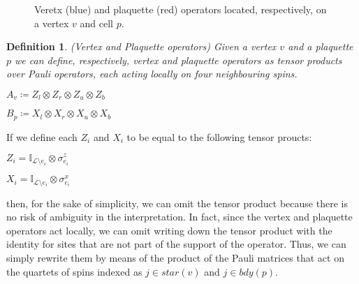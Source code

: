 \documentclass{Configuration_Files/PoliMi3i_thesis}
\newtheorem{definition}{Definition}[chapter]
\begin{document}
\begin{figure}
\begin{center}
	\end{center}
	\caption{Veretx (blue) and plaquette (red) operators located, respectively, on a vertex $v$ and cell $p$.}
	\label{fig:operators}
\end{figure}



\begin{definition} (Vertex and Plaquette operators) Given a vertex $v$ and a plaquette $p$ we can define, respectively, vertex and plaquette operators as tensor products over Pauli operators, each acting locally on four neighbouring spins. 
	
\begin{center}
	
	$ A_v \coloneq Z_{l} \otimes Z_{r} \otimes Z_{u} \otimes Z_{b}$ 
	
	$ B_p \coloneq X_{l} \otimes X_{r} \otimes X_{u} \otimes X_{b}$  

\end{center}
\end{definition}

If we define each $Z_i$ and $X_i$ to be equal to the following tensor proucts:

\begin{center}
	
	$Z_i = \mathbb{I}_{\mathcal{L} \setminus  e_i} \otimes \sigma^z_{e_i}$ 
	
	$X_i = \mathbb{I}_{\mathcal{L} \setminus  e_i} \otimes \sigma^x_{e_i} $  
	
\end{center}


then, for the sake of simplicity, we can omit the tensor product because there is no risk of ambiguity in the interpretation. In fact, since the vertex and plaquette operators act locally, we can omit writing down the tensor product with the identity for sites that are not part of the support of the operator. Thus, we can simply rewrite them by means of the product of the Pauli matrices that act on the quartets of spins indexed as $j \in star(v)$ and $j \in bdy(p)$. 
 
\end{document}
